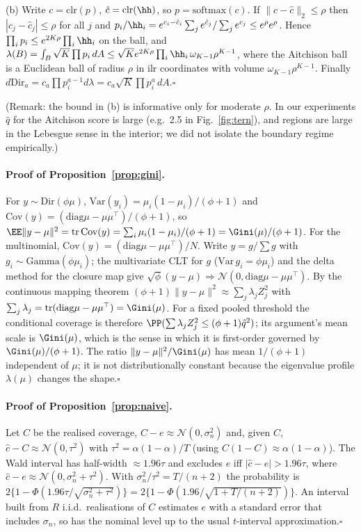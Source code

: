 (b) Write $c=\mathrm{clr}(p)$, $\hat c=\mathrm{clr}(\hh)$, so $p=\mathrm{softmax}(c)$. If $\|c-\hat c\|_2\le\rho$ then $|c_j-\hat c_j|\le\rho$ for all $j$ and $p_i/\hh_i=e^{c_i-\hat c_i}\sum_je^{\hat c_j}/\sum_je^{c_j}\le e^{\rho}e^{\rho}$. Hence $\prod_ip_i\le e^{2K\rho}\prod_i\hh_i$ on the ball, and $\lambda(B)=\int_B\sqrt K\prod p_i\,dA\le\sqrt Ke^{2K\rho}\prod_i\hh_i\,\omega_{K-1}\rho^{K-1}$, where the Aitchison ball is a Euclidean ball of radius $\rho$ in ilr coordinates with volume $\omega_{K-1}\rho^{K-1}$. Finally $d\mathrm{Dir}_a=c_a\prod p_i^{a-1}d\lambda=c_a\sqrt K\prod p_i^{a}\,dA$.\hfill$\square$

(Remark: the bound in (b) is informative only for moderate $\rho$. In our experiments $\hat q$ for the Aitchison score is large (e.g.\ 2.5 in Fig.~\ref{fig:tern}), and regions are large in the Lebesgue sense in the interior; we did not isolate the boundary regime empirically.)

\paragraph{Proof of Proposition~\ref{prop:gini}.} For $y\sim\mathrm{Dir}(\phi\mu)$, $\mathrm{Var}(y_i)=\mu_i(1-\mu_i)/(\phi+1)$ and $\mathrm{Cov}(y)=(\mathrm{diag}\mu-\mu\mu^\top)/(\phi+1)$, so $\EE\|y-\mu\|^2=\mathrm{tr}\,\mathrm{Cov}(y)=\sum_i\mu_i(1-\mu_i)/(\phi+1)=\Gini(\mu)/(\phi+1)$. For the multinomial, $\mathrm{Cov}(y)=(\mathrm{diag}\mu-\mu\mu^\top)/N$. Write $y=g/\sum g$ with $g_i\sim\mathrm{Gamma}(\phi\mu_i)$; the multivariate CLT for $g$ ($\mathrm{Var}\,g_i=\phi\mu_i$) and the delta method for the closure map give $\sqrt\phi(y-\mu)\Rightarrow\mathcal N(0,\mathrm{diag}\mu-\mu\mu^\top)$. By the continuous mapping theorem $(\phi+1)\|y-\mu\|^2\approx\sum_j\lambda_jZ_j^2$ with $\sum_j\lambda_j=\mathrm{tr}(\mathrm{diag}\mu-\mu\mu^\top)=\Gini(\mu)$. For a fixed pooled threshold the conditional coverage is therefore $\PP(\sum\lambda_jZ_j^2\le(\phi+1)\hat q^2)$; its argument's mean scale is $\Gini(\mu)$, which is the sense in which it is first-order governed by $\Gini(\mu)/(\phi+1)$. The ratio $\|y-\mu\|^2/\Gini(\mu)$ has mean $1/(\phi+1)$ independent of $\mu$; it is not distributionally constant because the eigenvalue profile $\lambda(\mu)$ changes the shape.\hfill$\square$

\paragraph{Proof of Proposition~\ref{prop:naive}.} Let $C$ be the realised coverage, $C-e\approx\mathcal N(0,\sigma_n^2)$ and, given $C$, $\hat c-C\approx\mathcal N(0,\tau^2)$ with $\tau^2=\alpha(1-\alpha)/T$ (using $C(1-C)\approx\alpha(1-\alpha)$). The Wald interval has half-width $\approx1.96\tau$ and excludes $e$ iff $|\hat c-e|>1.96\tau$, where $\hat c-e\approx\mathcal N(0,\sigma_n^2+\tau^2)$. With $\sigma_n^2/\tau^2=T/(n+2)$ the probability is $2\{1-\Phi(1.96\tau/\sqrt{\sigma_n^2+\tau^2})\}=2\{1-\Phi(1.96/\sqrt{1+T/(n+2)})\}$. An interval built from $R$ i.i.d.\ realisations of $C$ estimates $e$ with a standard error that includes $\sigma_n$, so has the nominal level up to the usual $t$-interval approximation.\hfill$\square$
